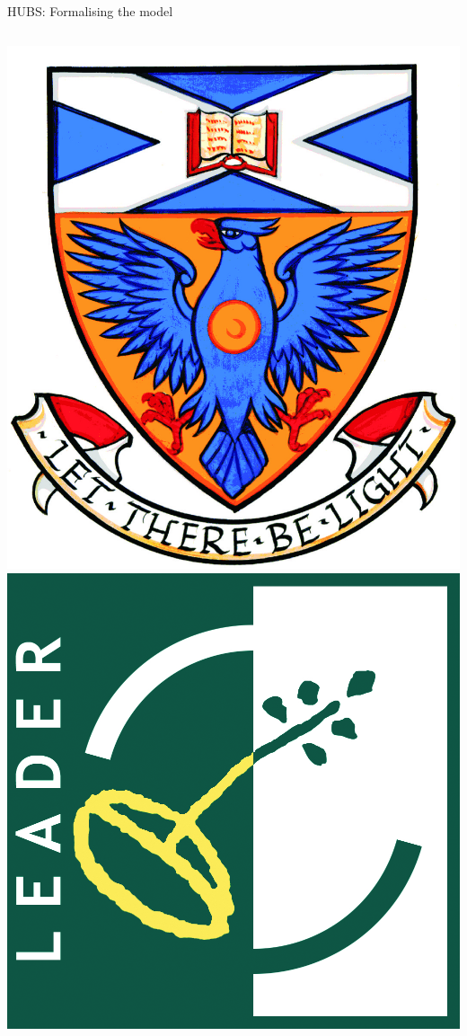 \documentclass{beamer}
\begin{document}
\begin{frame}{HUBS: Formalising the model}
\begin{columns}
\begin{center}
      \includegraphics[height=0.07\textheight]{carnegie-logo.jpg}
      \hspace{1pt}
      \includegraphics[height=0.07\textheight]{leader-and-words.jpg}

\end{center}
\end{columns}
\end{frame}
\end{document}
